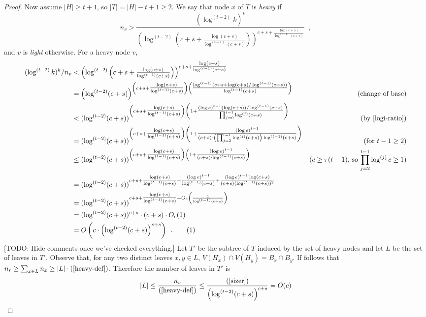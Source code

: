 \documentclass[kpfonts]{patmorin}
\newcommand\numberthis{\addtocounter{equation}{1}\tag{\theequation}}
\theoremstyle{named}
\begin{document}
\begin{proof}
    Now assume $|H|\ge t+1$, so $|T|=|H|-t+1\ge 2$.  We say that node $x$ of $T$ is \emph{heavy} if
    \begin{equation}
        n_v > \frac{(\log^{(t-2)} k)^k}{\left(\log^{(t-2)}\left(c+s+\tfrac{\log(c+s)}{\log^{(t-1)}(c+s)}\right)\right)^{c+s+\tfrac{\log(c+s)}{\log^{(t-1)}(c+s)}}} \enspace , \label{heavy-def}
    \end{equation}
    and $v$ is \emph{light} otherwise.  For a heavy node $v$,
    \begin{align*}
        (\log^{(t-2)} k)^k/n_v & < \left(\log^{(t-2)}\left(c+s+\tfrac{\log(c+s)}{\log^{(t-1)}(c+s)}\right)\right)^{c+s+\tfrac{\log(c+s)}{\log^{(t-1)}(c+s)}} \\
        & = \left(\log^{(t-2)}(c+s)\right)^{\left(c+s+\tfrac{\log(c+s)}{\log^{(t-1)}(c+s)}\right)
            \left(\tfrac{\log^{(t-1)}(c+s+\log(c+s)/\log^{(t-1)}(c+s))}{\log^{(t-1)}(c+s)}\right)} & \text{(change of base)} \\
        & < (\log^{(t-2)}(c+s))^{\left(c+s+\tfrac{\log(c+s)}{\log^{(t-1)}(c+s)}\right)
            \left(1 + \tfrac{(\log e)^{t-1}(\log(c+s))/\log^{(t-1)}(c+s)}{\prod_{j=0}^{t-1}\log^{(j)}(c+s)}\right)}
            & \text{(by \cref{logi-ratio})}\\
        & = (\log^{(t-2)}(c+s))^{\left(c+s+\tfrac{\log(c+s)}{\log^{(t-1)}(c+s)}\right)
            \left(1 + \tfrac{(\log e)^{t-1}}{(c+s)\cdot\left(\prod_{j=2}^{t-1}\log^{(j)}(c+s)\right)\log^{(t-1)}(c+s)}\right)} &
            \text{(for $t-1\ge 2$)}\\
        & \le (\log^{(t-2)}(c+s))^{\left(c+s+\tfrac{\log(c+s)}{\log^{(t-1)}(c+s)}\right)
            \left(1 + \tfrac{(\log e)^{t-1}}{(c+s)\cdot \log^{(t-1)}(c+s)}\right)}
            & \text{($c\ge \tau(t-1)$, so $\prod_{j=2}^{t-1}\log^{(j)}c\ge 1$)} \\
        & = (\log^{(t-2)}(c+s))^{c+s+\tfrac{\log(c+s)}{\log^{(t-1)}(c+s)} +
            \tfrac{(\log e)^{t-1}}{\log^{(t-1)}(c+s)} + \tfrac{(\log e)^{t-1}\log(c+s)}{(c+s)(\log^{(t-1)}(c+s))^2}}  \\
        & = (\log^{(t-2)}(c+s))^{c+s+\tfrac{\log(c+s)}{\log^{(t-1)}(c+s)} + O_c\left(\frac{1}{\log^{(t-1)}(c+s)}\right)}  \\
        & = (\log^{(t-2)}(c+s))^{c+s}\cdot (c+s)\cdot O_c(1) \\
        & = O\left(c\cdot\left(\log^{(t-2)}(c+s)\right)^{c+s}\right) \enspace .
        \numberthis \label{sizer}
    \end{align*}
    [TODO: Hide comments once we've checked everything.]
    Let $T'$ be the subtree of $T$ induced by the set of heavy nodes and let $L$ be the set of leaves in $T'$.  Observe that, for any two distinct leaves $x,y\in L$, $V(H_x)\cap V(H_y)=B_x\cap B_y$.  If follows that $n_r\ge \sum_{x\in L} n_x\ge |L|\cdot(\ref{heavy-def})$.  Therefore the number of leaves in $T'$ is
    \[
        |L| \le \frac{n_v}{(\ref{heavy-def})} \le \frac{(\ref{sizer})}{\left(\log^{(t-2)}(c+s)\right)^{c+s}} = O(c)
    \]


\end{proof}
\end{document}
